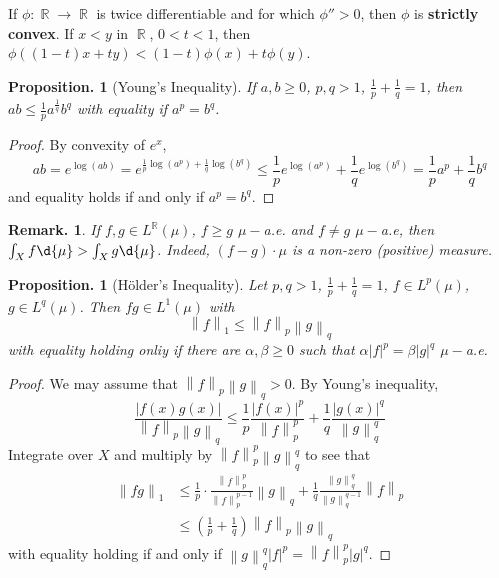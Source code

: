 \documentclass[11pt, a4paper]{memoir}
\DeclareMathOperator{\R}{{\mathbb{R}}}
\newcommand{\norm}[1]{\ensuremath{\left\lVert#1\right\rVert}}
\theoremstyle{change}
\newtheorem{proposition}[theorem]{Proposition.}
\theoremstyle{plain}
\theoremstyle{nonumberplain}
\newtheorem{remark}{Remark.}
\newtheorem{proof}{Proof}
\begin{document}
If $\phi:\R\to\R$ is twice differentiable and for which $\phi''>0$, then $\phi$ is \textbf{strictly convex}.
If $x<y$ in $\R$, $0<t<1$, then $\phi((1-t)x+ty)<(1-t)\phi(x)+t\phi(y)$.
\begin{proposition}[Young's Inequality]
    If $a,b\geq 0$, $p,q>1$, $\frac{1}{p}+\frac{1}{q}=1$, then $ab\leq\frac{1}{p}a^\frac{1}{q}b^q$ with equality if $a^p=b^q$.
\end{proposition}
\begin{proof}
    By convexity of $e^x$,
    \begin{equation*}
        ab=e^{\log(ab)}=e^{\frac{1}{p}\log(a^p)+\frac{1}{q}\log(b^q)}\leq\frac{1}{p}e^{\log(a^p)}+\frac{1}{q}e^{\log(b^q)}=\frac{1}{p}a^p+\frac{1}{q}b^q
    \end{equation*}
    and equality holds if and only if $a^p=b^q$.
\end{proof}
\begin{remark}
    If $f,g\in L^{\R}(\mu)$, $f\geq g$ $\mu-$a.e. and $f\neq g$ $\mu-$a.e, then $\int_X f\d{\mu}>\int_X g\d{\mu}$.
    Indeed, $(f-g)\cdot\mu$ is a non-zero (positive) measure.
\end{remark}
\begin{proposition}[H\"older's Inequality]
    Let $p,q>1$, $\frac{1}{p}+\frac{1}{q}=1$, $f\in L^p(\mu)$, $g\in L^q(\mu)$.
    Then $fg\in L^1(\mu)$ with
    \begin{equation*}
        \norm{f}_1\leq\norm{f}_p\norm{g}_q
    \end{equation*}
    with equality holding onliy if there are $\alpha,\beta\geq 0$ such that $\alpha|f|^p=\beta|g|^q$ $\mu-$a.e.
\end{proposition}
\begin{proof}
    We may assume that $\norm{f}_p\norm{g}_q>0$.
    By Young's inequality,
    \begin{equation*}
        \frac{|f(x)g(x)|}{\norm{f}_p\norm{g}_q}\leq\frac{1}{p}\frac{|f(x)|^p}{\norm{f}_p^p}+\frac{1}{q}\frac{|g(x)|^q}{\norm{g}_q^q}
    \end{equation*}
    Integrate over $X$ and multiply by $\norm{f}_p^p\norm{g}_q^q$ to see that
    \begin{align*}
        \norm{fg}_1 &\leq\frac{1}{p}\cdot\frac{\norm{f}_p^p}{\norm{f}_p^{p-1}}\norm{g}_q+\frac{1}{q}\frac{\norm{g}_q^q}{\norm{g}_q^{q-1}}\norm{f}_p\\
                    &\leq\left(\frac{1}{p}+\frac{1}{q}\right)\norm{f}_p\norm{g}_q
    \end{align*}
    with equality holding if and only if $\norm{g}_q^q|f|^p=\norm{f}_p^p|g|^q$.
\end{proof}
\end{document}
